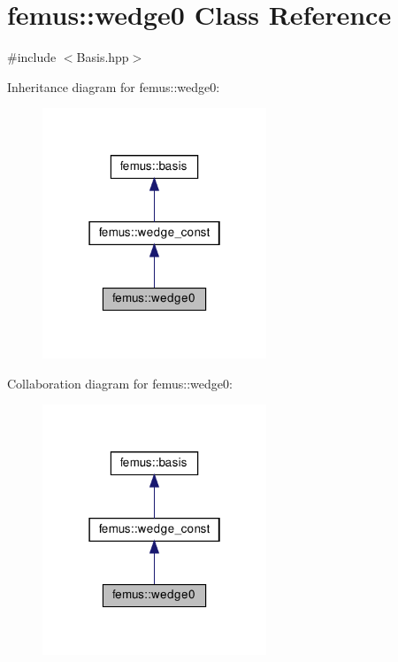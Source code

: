 \hypertarget{classfemus_1_1wedge0}{}\section{femus\+:\+:wedge0 Class Reference}
\label{classfemus_1_1wedge0}


{\ttfamily \#include $<$Basis.\+hpp$>$}



Inheritance diagram for femus\+:\+:wedge0\+:
\nopagebreak
\begin{figure}[H]
\begin{center}
\leavevmode
\includegraphics[width=190pt]{classfemus_1_1wedge0__inherit__graph}
\end{center}
\end{figure}


Collaboration diagram for femus\+:\+:wedge0\+:
\nopagebreak
\begin{figure}[H]
\begin{center}
\leavevmode
\includegraphics[width=190pt]{classfemus_1_1wedge0__coll__graph}
\end{center}
\end{figure}
